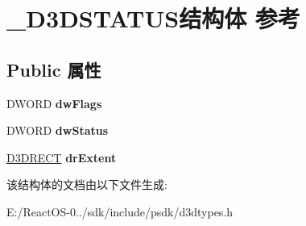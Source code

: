 \hypertarget{struct___d3_d_s_t_a_t_u_s}{}\section{\+\_\+\+D3\+D\+S\+T\+A\+T\+U\+S结构体 参考}
\label{struct___d3_d_s_t_a_t_u_s}
\subsection*{Public 属性}
\begin{DoxyCompactItemize}
\item 
\mbox{\label{struct___d3_d_s_t_a_t_u_s_a32831fef324f4c4edac3e57e8d4ca724}} 
D\+W\+O\+RD {\bfseries dw\+Flags}
\item 
\mbox{\label{struct___d3_d_s_t_a_t_u_s_ac1373aa6fb6d46cb851242c00d6fd235}} 
D\+W\+O\+RD {\bfseries dw\+Status}
\item 
\mbox{\label{struct___d3_d_s_t_a_t_u_s_ab4a6663af9e3703a2c3ccc801da5f689}} 
\hyperlink{struct___d3_d_r_e_c_t}{D3\+D\+R\+E\+CT} {\bfseries dr\+Extent}
\end{DoxyCompactItemize}


该结构体的文档由以下文件生成\+:\begin{DoxyCompactItemize}
\item 
E\+:/\+React\+O\+S-\/0../sdk/include/psdk/d3dtypes.\+h\end{DoxyCompactItemize}
